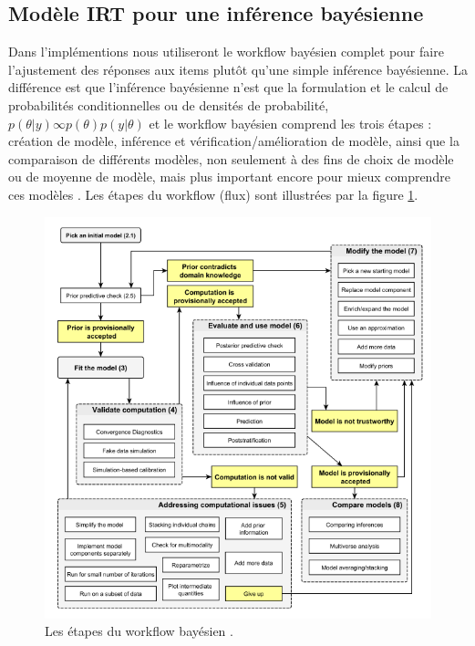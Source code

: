 \subsection{Modèle IRT pour une inférence bayésienne}
\label{irt_model_for_bayesian_inference}
Dans l’implémentions nous utiliseront le workflow bayésien complet pour faire l’ajustement des réponses aux items plutôt qu’une simple inférence bayésienne. La différence est que l'inférence bayésienne n'est que la formulation et le calcul de probabilités conditionnelles ou de densités de probabilité, \(\displaystyle p(\theta|y) \infty  p(\theta)p(y|\theta) \) et le workflow bayésien comprend les trois étapes : création de modèle, inférence et vérification/amélioration de modèle, ainsi que la comparaison de différents modèles, non seulement à des fins de choix de modèle ou de moyenne de modèle, mais plus important encore pour mieux comprendre ces modèles \cite{gelman2020bayesian}. Les étapes du workflow (flux) sont illustrées par la figure \ref{irt_process}. 
\begin{figure}[H]
	\begin{center}
		\includegraphics[width=\textwidth]{images/chapitre5/irt_process.png}
	\end{center}
	\caption{Les étapes du workflow bayésien \cite{gelman2020bayesian}.}
	\label{irt_process}
\end{figure}

